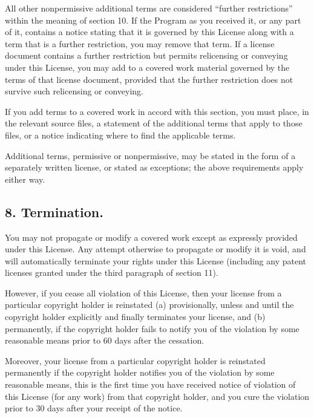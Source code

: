 \documentclass[letterpaper,10pt,english]{sphinxmanual}
\begin{document}
\sphinxAtStartPar
All other non\sphinxhyphen{}permissive additional terms are considered “further
restrictions” within the meaning of section 10.  If the Program as you
received it, or any part of it, contains a notice stating that it is
governed by this License along with a term that is a further
restriction, you may remove that term.  If a license document contains
a further restriction but permits relicensing or conveying under this
License, you may add to a covered work material governed by the terms
of that license document, provided that the further restriction does
not survive such relicensing or conveying.

\sphinxAtStartPar
If you add terms to a covered work in accord with this section, you
must place, in the relevant source files, a statement of the
additional terms that apply to those files, or a notice indicating
where to find the applicable terms.

\sphinxAtStartPar
Additional terms, permissive or non\sphinxhyphen{}permissive, may be stated in the
form of a separately written license, or stated as exceptions;
the above requirements apply either way.


\subsection{8. Termination.}
\label{\detokenize{license:termination}}
\sphinxAtStartPar
You may not propagate or modify a covered work except as expressly
provided under this License.  Any attempt otherwise to propagate or
modify it is void, and will automatically terminate your rights under
this License (including any patent licenses granted under the third
paragraph of section 11).

\sphinxAtStartPar
However, if you cease all violation of this License, then your
license from a particular copyright holder is reinstated (a)
provisionally, unless and until the copyright holder explicitly and
finally terminates your license, and (b) permanently, if the copyright
holder fails to notify you of the violation by some reasonable means
prior to 60 days after the cessation.

\sphinxAtStartPar
Moreover, your license from a particular copyright holder is
reinstated permanently if the copyright holder notifies you of the
violation by some reasonable means, this is the first time you have
received notice of violation of this License (for any work) from that
copyright holder, and you cure the violation prior to 30 days after
your receipt of the notice.
\end{document}
